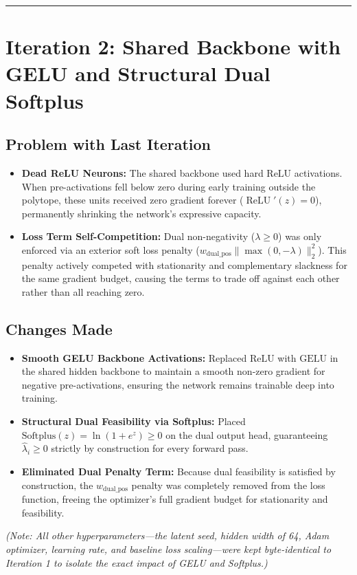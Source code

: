 \documentclass[11pt,a4paper]{article}
\begin{document}
\vspace{1em}
\hrule
\vspace{1.5em}

\section{Iteration 2: Shared Backbone with GELU and Structural Dual Softplus}

\subsection{Problem with Last Iteration}
\begin{itemize}[leftmargin=1.5em, itemsep=2pt]
    \item \textbf{Dead ReLU Neurons:} The shared backbone used hard $\text{ReLU}$ activations. When pre-activations fell below zero during early training outside the polytope, these units received zero gradient forever ($\operatorname{ReLU}'(z) = 0$), permanently shrinking the network's expressive capacity.
    \item \textbf{Loss Term Self-Competition:} Dual non-negativity ($\lambda \ge 0$) was only enforced via an exterior soft loss penalty ($w_{\text{dual\_pos}} \|\max(0, -\lambda)\|_2^2$). This penalty actively competed with stationarity and complementary slackness for the same gradient budget, causing the terms to trade off against each other rather than all reaching zero.
\end{itemize}

\subsection{Changes Made}
\begin{itemize}[leftmargin=1.5em, itemsep=2pt]
    \item \textbf{Smooth GELU Backbone Activations:} Replaced $\text{ReLU}$ with $\text{GELU}$ in the shared hidden backbone to maintain a smooth non-zero gradient for negative pre-activations, ensuring the network remains trainable deep into training.
    \item \textbf{Structural Dual Feasibility via Softplus:} Placed $\text{Softplus}(z) = \ln(1 + e^z) \ge 0$ on the dual output head, guaranteeing $\hat{\lambda}_i \ge 0$ strictly by construction for every forward pass.
    \item \textbf{Eliminated Dual Penalty Term:} Because dual feasibility is satisfied by construction, the $w_{\text{dual\_pos}}$ penalty was completely removed from the loss function, freeing the optimizer's full gradient budget for stationarity and feasibility.
\end{itemize}
\noindent\textit{\small(Note: All other hyperparameters---the latent seed, hidden width of 64, Adam optimizer, learning rate, and baseline loss scaling---were kept byte-identical to Iteration 1 to isolate the exact impact of GELU and Softplus.)}
\end{document}
